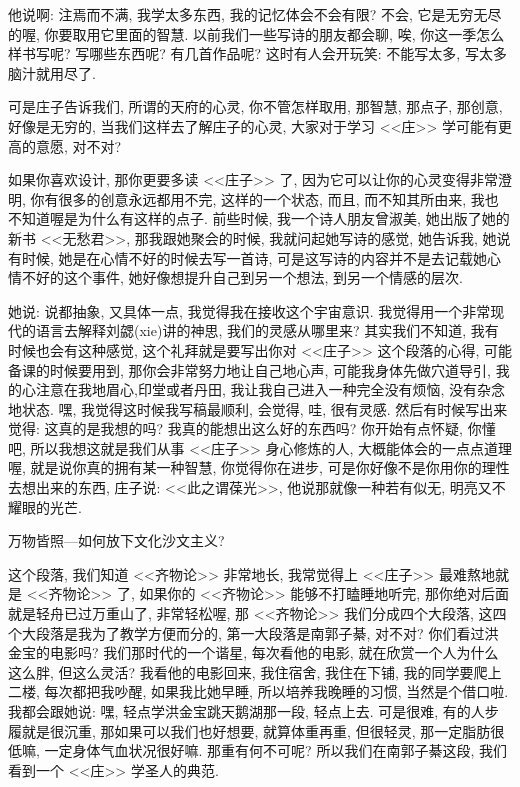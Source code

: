 \documentclass[11pt]{article}
\begin{document}
\vspace{-0.5cm}

他说啊: {\color{blue} 注焉而不满}, 我学太多东西, 我的记忆体会不会有限? 不会, 它是无穷无尽的喔, 你要取用它里面的智慧. 以前我们一些写诗的朋友都会聊, 唉, 你这一季怎么样书写呢? 写哪些东西呢? 有几首作品呢? 这时有人会开玩笑: 不能写太多, 写太多脑汁就用尽了.

可是庄子告诉我们, 所谓的天府的心灵, 你不管怎样取用, 那智慧, 那点子, 那创意, 好像是无穷的, 当我们这样去了解庄子的心灵, 大家对于学习 <<庄>> 学可能有更高的意愿, 对不对? 

如果你喜欢设计, 那你更要多读 <<庄子>> 了, 因为它可以让你的心灵变得非常澄明, 你有很多的创意永远都用不完, 这样的一个状态, 而且, {\color{blue} 而不知其所由来}, 我也不知道喔是为什么有这样的点子. 前些时候, 我一个诗人朋友曾淑美, 她出版了她的新书 <<无愁君>>, 那我跟她聚会的时候, 我就问起她写诗的感觉, 她告诉我, 她说有时候, 她是在心情不好的时候去写一首诗, 可是这写诗的内容并不是去记载她心情不好的这个事件, 她好像想提升自己到另一个想法, 到另一个情感的层次. 

她说: 说都抽象, 又具体一点, 我觉得我在接收这个宇宙意识. 我觉得用一个非常现代的语言去解释刘勰(xie)讲的神思, 我们的灵感从哪里来? 其实我们不知道, 我有时候也会有这种感觉, 这个礼拜就是要写出你对 <<庄子>> 这个段落的心得, 可能备课的时候要用到, 那你会非常努力地让自己地心声, 可能我身体先做穴道导引, 我的心注意在我地眉心,印堂或者丹田, 我让我自己进入一种完全没有烦恼, 没有杂念地状态. 嘿, 我觉得这时候我写稿最顺利, 会觉得, 哇, 很有灵感. 然后有时候写出来觉得: 这真的是我想的吗? 我真的能想出这么好的东西吗? 你开始有点怀疑, 你懂吧, 所以我想这就是我们从事 <<庄子>> 身心修炼的人, 大概能体会的一点点道理喔, 就是说你真的拥有某一种智慧, 你觉得你在进步, 可是你好像不是你用你的理性去想出来的东西, 庄子说: <<此之谓葆光>>, 他说那就像一种若有似无, 明亮又不耀眼的光芒.


{\Large {\color{purple} 万物皆照---如何放下文化沙文主义?}}

这个段落, 我们知道 <<齐物论>> 非常地长, 我常觉得上 <<庄子>> 最难熬地就是 <<齐物论>> 了, 如果你的 <<齐物论>> 能够不打瞌睡地听完, 那你绝对后面就是轻舟已过万重山了, 非常轻松喔, 那 <<齐物论>> 我们分成四个大段落, 这四个大段落是我为了教学方便而分的, 第一大段落是南郭子綦, 对不对? 你们看过洪金宝的电影吗? 我们那时代的一个谐星, 每次看他的电影, 就在欣赏一个人为什么这么胖, 但这么灵活? 我看他的电影回来, 我住宿舍, 我住在下铺, 我的同学要爬上二楼, 每次都把我吵醒, 如果我比她早睡, 所以培养我晚睡的习惯, 当然是个借口啦. 我都会跟她说: 嘿, 轻点学洪金宝跳天鹅湖那一段, 轻点上去. 可是很难, 有的人步履就是很沉重, 那如果可以我们也好想要, 就算体重再重, 但很轻灵, 那一定脂肪很低嘛, 一定身体气血状况很好嘛. 那重有何不可呢? 所以我们在南郭子綦这段, 我们看到一个 <<庄>> 学圣人的典范.
\end{document}
